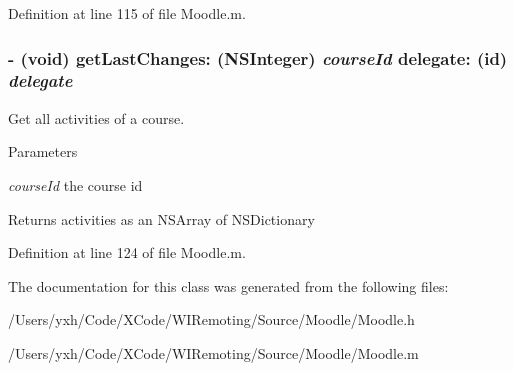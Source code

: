 Definition at line 115 of file Moodle.m.\hypertarget{interface_moodle_a6326606ca7ade3a39a82b0541dd60df1}{
\subsubsection[{getLastChanges:delegate:}]{\setlength{\rightskip}{0pt plus 5cm}-\/ (void) getLastChanges: (NSInteger) {\em courseId}\/ delegate: (id) {\em delegate}}}
\label{interface_moodle_a6326606ca7ade3a39a82b0541dd60df1}


Get all activities of a course. 
\begin{DoxyParams}{Parameters}
\item[{\em courseId}]the course id \end{DoxyParams}
\begin{DoxyReturn}{Returns}
activities as an NSArray of NSDictionary 
\end{DoxyReturn}


Definition at line 124 of file Moodle.m.

The documentation for this class was generated from the following files:\begin{DoxyCompactItemize}
\item 
/Users/yxh/Code/XCode/WIRemoting/Source/Moodle/Moodle.h\item 
/Users/yxh/Code/XCode/WIRemoting/Source/Moodle/Moodle.m\end{DoxyCompactItemize}
